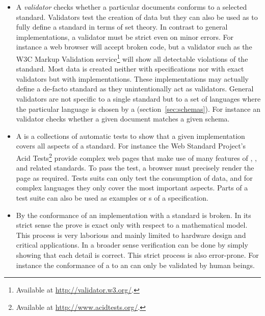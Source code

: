 \begin{itemize}

 \item A \emph{validator} checks whether a particular documents conforms to a
 selected standard. Validators test the creation of data but they can also be
 used as  to fully define a standard in terms of set
 theory.  In contrast to general implementations, a validator must be strict
 even on minor errors.  For instance a web browser will accept broken
  code, but a validator such as the W3C Markup Validation
 service\footnote{Available at \url{http://validator.w3.org/}.} will show all
 detectable violations of the  standard. Most data is created
 neither with specifications nor with exact validators but with
 implementations. These implementations may actually define a de-facto standard
 as they unintentionally act as validators. General validators are not specific
 to a single standard but to a set of languages where the particular language
 is chosen by a  (section~\ref{sec:schemas}).
 For instance an  validator checks whether a given 
 document matches a given  schema.

 \item A  is a collections of automatic tests to show that a
 given implementation covers all aspects of a standard. For instance the Web
 Standard Project's Acid Tests\footnote{Available at
 \url{http://www.acidtests.org/}.} provide complex web pages that make use of
 many features of , , and related standards.  To pass the
 test, a browser must precisely render the page as required. Tests suits can
 only test the consumption of data, and for complex languages they only cover
 the most important aspects. Parts of a test suite can also be used as examples
 or s of a specification.

 \item By  the conformance of an implementation with a
 standard is broken. In its strict sense the prove is exact only with
 respect to a mathematical model. This process is very laborious and mainly
 limited to hardware design and critical applications. In a broader sense
 verification can be done by simply showing that each detail is correct.  This
 strict process is also error-prone. For instance the conformance
 of a  to an  can only be
 validated by human beings.

\end{itemize}

